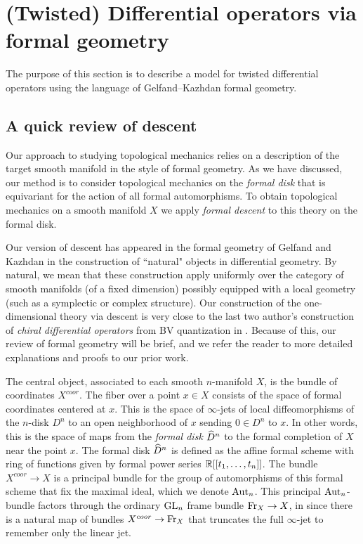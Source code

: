 \section{(Twisted) Differential operators via formal geometry}

The purpose of this section is to describe a model for twisted differential operators using the language of Gelfand--Kazhdan formal geometry. 


\subsection{A quick review of descent}

Our approach to studying topological mechanics relies on a description of the target smooth manifold in the style of formal geometry. 
As we have discussed, our method is to consider topological mechanics on the {\em formal disk} that is equivariant for the action of all formal automorphisms. 
To obtain topological mechanics on a smooth manifold $X$ we apply {\em formal descent} to this theory on the formal disk.

Our version of descent has appeared in the formal geometry of Gelfand and Kazhdan \cite{GK} in the construction of ``natural" objects in differential geometry. 
By natural, we mean that these construction apply uniformly over the category of smooth manifolds (of a fixed dimension) possibly equipped with a local geometry (such as a symplectic or complex structure). 
Our construction of the one-dimensional theory via descent is very close to the last two author's 
construction of {\em chiral differential operators} from BV quantization in \cite{GGW}. 
Because of this, our review of formal geometry will be brief, and we refer the reader to more detailed explanations and proofs to our prior work. 

The central object, associated to each smooth $n$-manifold $X$, is the bundle of coordinates $X^{coor}$. 
The fiber over a point $x \in X$ consists of the space of formal coordinates centered at $x$. 
This is the space of $\infty$-jets of local diffeomorphisms of the $n$-disk $D^n$ to an open neighborhood of $x$ sending $0 \in D^n$ to $x$. 
In other words, this is the space of maps from the {\em formal disk} $\widehat{D}^n$ to the formal completion of $X$ near the point $x$. 
The formal disk $\widehat{D}^n$ is defined as the affine formal scheme with ring of functions given by formal power series $\mathbb R[[t_1,\ldots,t_n]]$.
The bundle $X^{coor} \to X$ is a principal bundle for the group of automorphisms of this formal scheme that fix the maximal ideal, which we denote ${\rm Aut}_n$. 
This principal ${\rm Aut}_n$-bundle factors through the ordinary ${\rm GL}_n$ frame bundle ${\rm Fr}_X \to X$, in since there is a natural map of bundles $X^{coor} \to {\rm Fr}_X$ that truncates the full $\infty$-jet to remember only the linear jet. 

